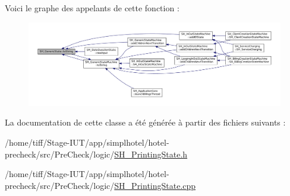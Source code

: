 Voici le graphe des appelants de cette fonction \-:\nopagebreak
\begin{figure}[H]
\begin{center}
\leavevmode
\includegraphics[width=350pt]{classSH__GenericState_a7779babbb40f3f8faa71112204d9804f_icgraph}
\end{center}
\end{figure}




La documentation de cette classe a été générée à partir des fichiers suivants \-:\begin{DoxyCompactItemize}
\item 
/home/tiff/\-Stage-\/\-I\-U\-T/app/simplhotel/hotel-\/precheck/src/\-Pre\-Check/logic/\hyperlink{SH__PrintingState_8h}{S\-H\-\_\-\-Printing\-State.\-h}\item 
/home/tiff/\-Stage-\/\-I\-U\-T/app/simplhotel/hotel-\/precheck/src/\-Pre\-Check/logic/\hyperlink{SH__PrintingState_8cpp}{S\-H\-\_\-\-Printing\-State.\-cpp}\end{DoxyCompactItemize}
